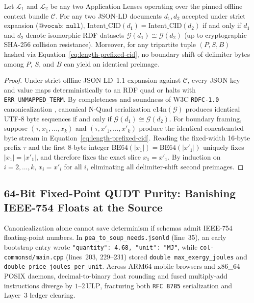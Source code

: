 \begin{theorem}
\label{thm:semantic-hash-equivalence}
Let $\mathcal{L}_1$ and $\mathcal{L}_2$ be any two Application Lenses operating over the pinned offline context bundle $\mathcal{C}$. For any two JSON-LD documents $d_1, d_2$ accepted under strict expansion ($\texttt{@vocab: null}$), $\mathrm{Intent\_CID}(d_1) = \mathrm{Intent\_CID}(d_2)$ if and only if $d_1$ and $d_2$ denote isomorphic RDF datasets $\mathcal{G}(d_1) \cong \mathcal{G}(d_2)$ (up to cryptographic SHA-256 collision resistance). Moreover, for any tripartite tuple $(P, S, B)$ hashed via Equation~\eqref{eq:length-prefixed-cid}, no boundary shift of delimiter bytes among $P$, $S$, and $B$ can yield an identical preimage.
\end{theorem}
\begin{proof}
Under strict offline JSON-LD~1.1 expansion against $\mathcal{C}$, every JSON key and value maps deterministically to an RDF quad or halts with \texttt{ERR\_UNMAPPED\_TERM}. By completeness and soundness of W3C \texttt{RDFC-1.0} canonicalization \parencite{w3c2024rdfc}, canonical N-Quad serialization $\mathrm{c14n}(\mathcal{G})$ produces identical UTF-8 byte sequences if and only if $\mathcal{G}(d_1) \cong \mathcal{G}(d_2)$. For boundary framing, suppose $(\tau, x_1, \dots, x_k)$ and $(\tau, x'_1, \dots, x'_k)$ produce the identical concatenated byte stream in Equation~\eqref{eq:length-prefixed-cid}. Reading the fixed-width 16-byte prefix $\tau$ and the first 8-byte integer $\mathrm{BE64}(|x_1|) = \mathrm{BE64}(|x'_1|)$ uniquely fixes $|x_1| = |x'_1|$, and therefore fixes the exact slice $x_1 = x'_1$. By induction on $i = 2, \dots, k$, $x_i = x'_i$ for all $i$, eliminating all delimiter-shift second preimages.
\end{proof}

\subsection{64-Bit Fixed-Point QUDT Purity: Banishing IEEE-754 Floats at the Source}

Canonicalization alone cannot save determinism if schemas admit IEEE-754 floating-point numbers. In \texttt{pea\_to\_soup\_needs.jsonld} (line~35), an early bootstrap entry wrote \texttt{"quantity": 4.68, "unit": "MJ"}, while \texttt{col-commonsd/main.cpp} (lines~203, 229--231) stored \texttt{double max\_exergy\_joules} and \texttt{double price\_joules\_per\_unit}. Across ARM64 mobile browsers and x86\_64 POSIX daemons, decimal-to-binary float rounding and fused multiply-add instructions diverge by $1\text{--}2\,\mathrm{ULP}$, fracturing both \texttt{RFC 8785} serialization and Layer~3 ledger clearing.

